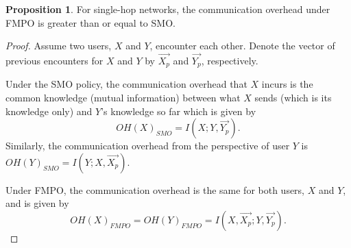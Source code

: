 \documentclass[conference]{IEEEtran}
\theoremstyle{definition}
\newtheorem{prop}{Proposition}
\begin{document}
\begin{prop}
For single-hop networks, the communication overhead under FMPO is greater than or equal to SMO.
\end{prop}
\vspace{-0.2 cm}
\begin{proof}
Assume two users, $X$ and $Y$, encounter each other. Denote the vector of previous encounters for $X$ and $Y$ by $\vec{X_p}$ and $\vec{Y_p}$, respectively.

Under the SMO policy, the communication overhead that $X$ incurs is the common knowledge (mutual information) between what $X$ sends (which is its knowledge only) and $Y$'s
knowledge so far which is given by 
\begin{equation}
OH(X)_{SMO}=I(X;Y,\vec{Y_p}).
\label{overheadX}
\end{equation}
Similarly, the communication overhead from the perspective of user $Y$ is $OH(Y)_{SMO}=I(Y;X,\vec{X_p})$.

Under FMPO, the communication overhead is the same for both users, $X$ and $Y$, and is given by
\begin{equation} 
OH(X)_{FMPO}=OH(Y)_{FMPO}=I(X,\vec{X_p};Y, \vec{Y_p}).
\label{overheadXY}
\end{equation}


\end{proof}
\end{document}
